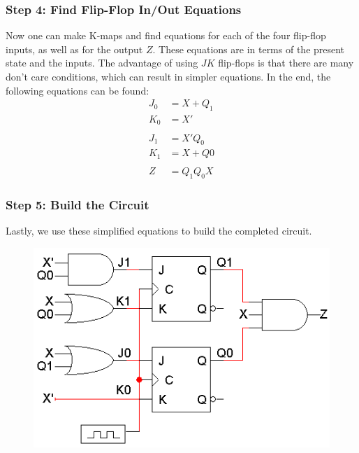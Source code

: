 \subsubsection{Step 4: Find Flip-Flop In/Out Equations}
\label{subsubsec:step4-find-ff-io-equations}

Now one can make K-maps and find equations for each of the four flip-flop inputs, as well as for the output $Z$. These equations are in terms of the present state and the inputs. The advantage of using $JK$ flip-flops is that there are many don't care conditions, which can result in simpler equations. In the end, the following equations can be found:
\begin{align*}
	J_0 &= X + Q_1\\
	K_0 &= X'\\
  &\\
  J_1 &= X'Q_0\\
	K_1 &= X + Q0\\
  &\\
	Z &= Q_1Q_0X
\end{align*}

\subsubsection{Step 5: Build the Circuit}
\label{subsubsec:step5-build-the-circuit}

Lastly, we use these simplified equations to build the completed circuit.
\begin{figure}[H]
  \centering
  \includegraphics[width=\linewidth]{img/design-example-circuit.png}
\end{figure}
